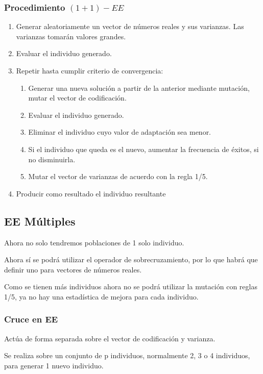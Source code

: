 \documentclass[12pt, twoside, openright]{report} %
\begin{document}
\subsubsection{Procedimiento $(1+1)-EE$}
\begin{enumerate}
	\item Generar aleatoriamente un vector de números reales y sus varianzas. Las varianzas tomarán valores grandes.
	\item Evaluar el individuo generado.
	\item Repetir hasta cumplir criterio de convergencia:
	\begin{enumerate}
		\item Generar una nueva solución a partir de la anterior mediante mutación, mutar el vector de codificación.
		\item Evaluar el individuo generado.
		\item Eliminar el individuo cuyo valor de adaptación sea menor.
		\item Si el individuo que queda es el nuevo, aumentar la frecuencia de éxitos, si no disminuirla.
		\item Mutar el vector de varianzas de acuerdo con la regla 1/5.
	\end{enumerate}
	
	\item Producir como resultado el individuo resultante
\end{enumerate}

\subsection{EE Múltiples}
Ahora no solo tendremos poblaciones de 1 solo individuo.

Ahora sí se podrá utilizar el operador de sobrecruzamiento, por lo que habrá que definir uno para vectores de números reales.

Como se tienen más individuos ahora no se podrá utilizar la mutación con reglas 1/5, ya no hay una estadística de mejora para cada individuo.

\subsubsection{Cruce en EE}
Actúa de forma separada sobre el vector de codificación y varianza.

Se realiza sobre un conjunto de p individuos, normalmente 2, 3 o 4 individuos, para generar 1 nuevo individuo.
\end{document}

